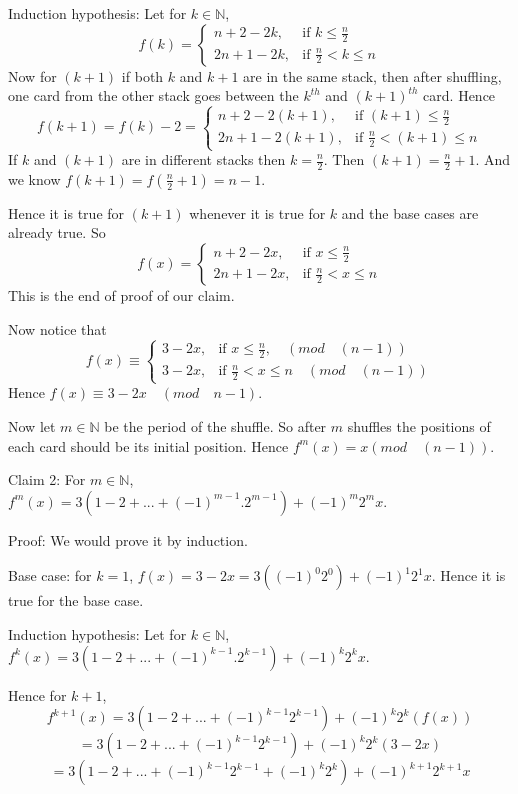 \documentclass[10pt]{article}
\begin{document}
Induction hypothesis: Let for $k\in \mathbb{N}$, $$f(k)=\begin{cases}
    n+2-2k ,& \text{if } k\leq \frac{n}{2}\\
    2n+1-2k ,& \text{if } \frac{n}{2}<k\leq n
\end{cases}$$
Now for $(k+1)$ if both $k$ and $k+1$ are in the same stack, then after shuffling, one card from the other stack goes between the $k^{th}$ and $(k+1)^{th}$ card. Hence $$f(k+1)=f(k)-2=\begin{cases}
    n+2-2(k+1) ,& \text{if } (k+1)\leq \frac{n}{2}\\
    2n+1-2(k+1) ,& \text{if } \frac{n}{2}<(k+1)\leq n
\end{cases}$$
If $k$ and $(k+1)$ are in different stacks then $k=\frac{n}{2}$. Then $(k+1)=\frac{n}{2}+1$. And we know $f(k+1)=f(\frac{n}{2}+1)=n-1$.

Hence it is true for $(k+1)$ whenever it is true for $k$ and the base cases are already true. So $$f(x)= 
\begin{cases}
    n+2-2x ,& \text{if } x\leq \frac{n}{2}\\
    2n+1-2x ,& \text{if } \frac{n}{2}<x\leq n
\end{cases}$$
This is the end of proof of our claim.

\vspace{7mm}
Now notice that $$f(x)\equiv 
\begin{cases}
    3-2x ,& \text{if } x\leq \frac{n}{2},\quad (mod\quad (n-1))\\
    3-2x ,& \text{if } \frac{n}{2}<x\leq n\quad (mod\quad (n-1)) 
\end{cases}$$
Hence $f(x)\equiv 3-2x \quad (mod\quad n-1)$.

Now let $m\in\mathbb{N}$ be the period of the shuffle. So after $m$ shuffles the positions of each card should be its initial position. Hence $f^m(x)=x (mod \quad (n-1))$.

\vspace{6mm}
Claim 2: For $m\in\mathbb{N}$, $f^m(x)=3(1-2+...+(-1)^{m-1}.2^{m-1})+(-1)^{m}2^mx$.

Proof: We would prove it by induction.

Base case: for $k=1$, $f(x)=3-2x=3((-1)^{0}2^{0})+(-1)^{1}2^{1}x$. Hence it is true for the base case.

Induction hypothesis: Let for $k\in\mathbb{N}$,
$f^k(x)=3(1-2+...+(-1)^{k-1}.2^{k-1})+(-1)^{k}2^kx$.

Hence for $k+1$, $$f^{k+1}(x)=3(1-2+...+(-1)^{k-1}2^{k-1})+(-1)^{k}2^k(f(x))$$ $$=3(1-2+...+(-1)^{k-1}2^{k-1})+(-1)^{k}2^k(3-2x)$$ $$=3(1-2+...+(-1)^{k-1}2^{k-1}+(-1)^{k}2^{k})+(-1)^{k+1}2^{k
+1}x$$
\end{document}

